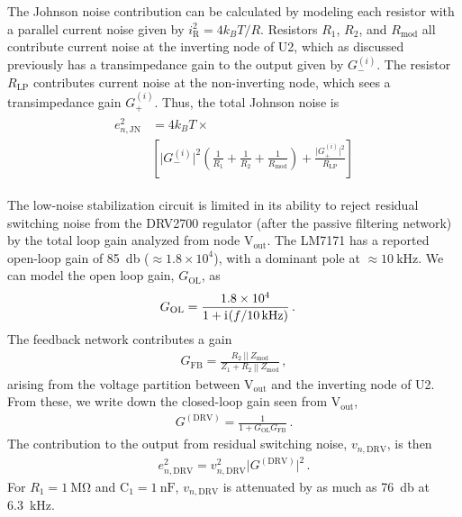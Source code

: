 \documentclass[aip,rsi,reprint]{revtex4-1} %
\newcommand{\iu}{\mathrm{i}\mkern1mu}
\begin{document}
The Johnson noise contribution can be calculated by modeling each resistor with a parallel current noise given by $i_\text{R}^2 = 4k_B T/R$.
Resistors $R_1$, $R_2$, and $R_\text{mod}$ all contribute current noise at the inverting node of U2, which as discussed previously has a transimpedance gain to the output given by $G_{-}^{(i)}$.
The resistor $R_\text{LP}$ contributes current noise at the non-inverting node, which sees a transimpedance gain $G_{+}^{(i)}$.
Thus, the total Johnson noise is
\begin{align}
\begin{split}
e^2_{n,\text{JN}} &= 4 k_B T \times \\
&\left[ \big|G_{-}^{(i)}\big|^2 \left(\frac{1}{R_1} + \frac{1}{R_2} + \frac{1}{R_\text{mod}} \right) + 
\frac{\big|G_{+}^{(i)}\big|^2}{R_\text{LP}} \right]
\end{split}
\end{align}



The low-noise stabilization circuit is limited in its ability to reject residual switching noise from the DRV2700 regulator (after the passive filtering network) by the total loop gain analyzed from node $\text{V}_\text{out}$.
The LM7171 has a reported open-loop gain of \SI{85}{\decibel} ($\approx 1.8\times 10^4$), with a dominant pole at $\approx\SI{10}{\kilo\hertz}$.\cite{LM7171Datasheet}
We can model the open loop gain, $G_\text{OL}$, as
\begin{align}
G_\text{OL} &= \frac{1.8\times10^4}{1 + \iu (f/\SI{10}{\kilo\hertz})}\,.
\end{align}
The feedback network contributes a gain
\begin{align}
G_\text{FB} = \frac{R_2~||~Z_\text{mod}}{Z_1 + R_2~||~Z_\text{mod}}\,,
\end{align}
arising from the voltage partition between $\text{V}_\text{out}$ and the inverting node of U2.
From these, we write down the closed-loop gain seen from $\text{V}_\text{out}$,
\begin{align}
G^{(\text{DRV})} = \frac{1}{1+G_\text{OL} G_\text{FB}}\,.
\end{align}
The contribution to the output from residual switching noise, $v_{n,\text{DRV}}$, is then
\begin{align}
e^2_{n,\text{DRV}} = v^2_{n,\text{DRV}}\big|G^{(\text{DRV})}\big|^2\,.
\end{align}
For $R_1=\SI{1}{\mega\ohm}$ and $\text{C}_1 = \SI{1}{\nano\farad}$, $v_{n,\text{DRV}}$ is attenuated by as much as \SI{76}{\decibel} at \SI{6.3}{\kilo\hertz}.
\end{document}
